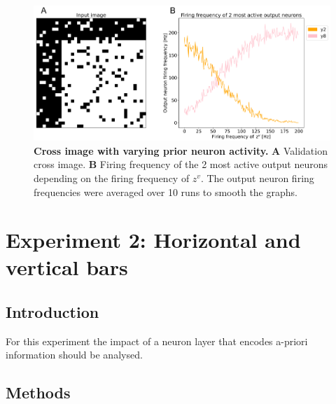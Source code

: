 \begin{figure}
  \includegraphics[width=\linewidth]{figures/horvertAdaptiveInh/YFrequency_prior.png}
  \caption{\textbf{Cross image with varying prior neuron activity.} \textbf{A} Validation cross image. \textbf{B} Firing frequency of the 2 most active output neurons depending on the firing frequency of $z^v$. The output neuron firing frequencies were averaged over 10 runs to smooth the graphs.}
  \label{fig:horvertAdaptiveInhibitionVariablePriorResults}
\end{figure}






























\iffalse
\section{Experiment 2: Horizontal and vertical bars}
\label{section:horvert}

 \subsection{Introduction}

For this experiment the impact of a neuron layer that encodes a-priori information should be analysed.

\subsection{Methods}


